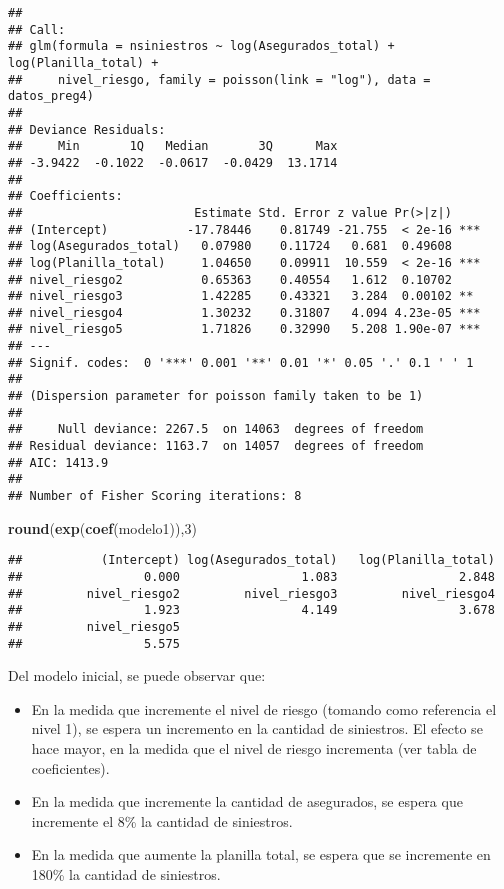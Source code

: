 \documentclass[]{article}
\newenvironment{Shaded}{\begin{snugshade}}{\end{snugshade}}
\newcommand{\DecValTok}[1]{\textcolor[rgb]{0.00,0.00,0.81}{#1}}
\newcommand{\KeywordTok}[1]{\textcolor[rgb]{0.13,0.29,0.53}{\textbf{#1}}}
\newcommand{\NormalTok}[1]{#1}
\providecommand{\tightlist}{%
  \setlength{\itemsep}{0pt}\setlength{\parskip}{0pt}}
\begin{document}
\begin{verbatim}
## 
## Call:
## glm(formula = nsiniestros ~ log(Asegurados_total) + log(Planilla_total) + 
##     nivel_riesgo, family = poisson(link = "log"), data = datos_preg4)
## 
## Deviance Residuals: 
##     Min       1Q   Median       3Q      Max  
## -3.9422  -0.1022  -0.0617  -0.0429  13.1714  
## 
## Coefficients:
##                        Estimate Std. Error z value Pr(>|z|)    
## (Intercept)           -17.78446    0.81749 -21.755  < 2e-16 ***
## log(Asegurados_total)   0.07980    0.11724   0.681  0.49608    
## log(Planilla_total)     1.04650    0.09911  10.559  < 2e-16 ***
## nivel_riesgo2           0.65363    0.40554   1.612  0.10702    
## nivel_riesgo3           1.42285    0.43321   3.284  0.00102 ** 
## nivel_riesgo4           1.30232    0.31807   4.094 4.23e-05 ***
## nivel_riesgo5           1.71826    0.32990   5.208 1.90e-07 ***
## ---
## Signif. codes:  0 '***' 0.001 '**' 0.01 '*' 0.05 '.' 0.1 ' ' 1
## 
## (Dispersion parameter for poisson family taken to be 1)
## 
##     Null deviance: 2267.5  on 14063  degrees of freedom
## Residual deviance: 1163.7  on 14057  degrees of freedom
## AIC: 1413.9
## 
## Number of Fisher Scoring iterations: 8
\end{verbatim}

\begin{Shaded}
\begin{Highlighting}[]
\KeywordTok{round}\NormalTok{(}\KeywordTok{exp}\NormalTok{(}\KeywordTok{coef}\NormalTok{(modelo1)),}\DecValTok{3}\NormalTok{)}
\end{Highlighting}
\end{Shaded}

\begin{verbatim}
##           (Intercept) log(Asegurados_total)   log(Planilla_total) 
##                 0.000                 1.083                 2.848 
##         nivel_riesgo2         nivel_riesgo3         nivel_riesgo4 
##                 1.923                 4.149                 3.678 
##         nivel_riesgo5 
##                 5.575
\end{verbatim}

Del modelo inicial, se puede observar que:

\begin{itemize}
\tightlist
\item
  En la medida que incremente el nivel de riesgo (tomando como
  referencia el nivel 1), se espera un incremento en la cantidad de
  siniestros. El efecto se hace mayor, en la medida que el nivel de
  riesgo incrementa (ver tabla de coeficientes).
\item
  En la medida que incremente la cantidad de asegurados, se espera que
  incremente el 8\% la cantidad de siniestros.
\item
  En la medida que aumente la planilla total, se espera que se
  incremente en 180\% la cantidad de siniestros.
\end{itemize}
\end{document}

